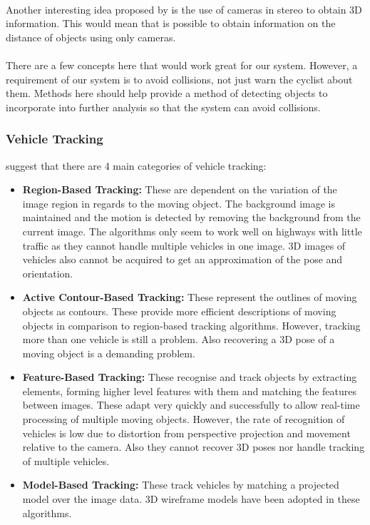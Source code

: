 \documentclass[a4paper]{report}
\begin{document}
\paragraph{}Another interesting idea proposed by \cite{CWS_transit_buses} is the use of cameras in stereo to obtain 3D information. This would mean that is possible to obtain information on the distance of objects using only cameras.

\paragraph{}There are a few concepts here that would work great for our system. However, a requirement of our system is to avoid collisions, not just warn the cyclist about them. Methods here should help provide a method of detecting objects to incorporate into further analysis so that the system can avoid collisions. 

\subsubsection{Vehicle Tracking}
\cite{prediction_3D_vehicle_tracking} suggest that there are 4 main categories of vehicle tracking:
\begin{itemize}
\item \textbf{Region-Based Tracking:} These are dependent on the variation of the image region in regards to the moving object. The background image is maintained and the motion is detected by removing the background from the current image. The algorithms only seem to work well on highways with little traffic as they cannot handle multiple vehicles in one image. 3D images of vehicles also cannot be acquired to get an approximation of the pose and orientation. 
\item \textbf{Active Contour-Based Tracking:} These represent the outlines of moving objects as contours. These provide more efficient descriptions of moving objects in comparison to region-based tracking algorithms. However, tracking more than one vehicle is still a problem. Also recovering a 3D pose of a moving object is a demanding problem. 
\item \textbf{Feature-Based Tracking:} These recognise and track objects by extracting elements, forming higher level features with them and matching the features between images. These adapt very quickly and successfully to allow real-time processing of multiple moving objects. However, the rate of recognition of vehicles is low due to distortion from perspective projection and movement relative to the camera. Also they cannot recover 3D poses nor handle tracking of multiple vehicles.
\item \textbf{Model-Based Tracking:} These track vehicles by matching a projected model over the image data. 3D wireframe models have been adopted in these algorithms.
\end{itemize}
\end{document}

